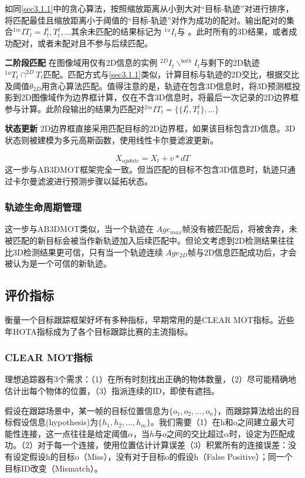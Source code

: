 如同\ref{sec3.1.1}中的贪心算法，按照缩放距离从小到大对“目标-轨迹”对进行排序，将匹配最佳且缩放距离小于阈值的“目标-轨迹”对作为成功的配对。输出配对的集合$^{1m}IT_t={{I_t^i,T_t^j},...}$其余未匹配的结果标记为 $^{1u}I_t$与 。此时所有的3D结果，或者成功配对，或者未配对且不参与后续匹配。

\textbf{二阶段匹配} 在图像域用仅有2D信息的实例 $^{2D}I_t\backslash^{both}I_t$与剩下的2D轨迹 $^{1u}T_t\cap^{2D}T_t$匹配。匹配方式与\ref{sec3.1.1}类似，计算目标与轨迹的2D交比，根据交比及阈值$\theta_{2D}$用贪心算法匹配。值得注意的是，轨迹在包含3D信息时，将3D预测框投影到2D图像域作为边界框计算，仅在不含3D信息时，将最后一次记录的2D边界框参与计算。此阶段输出的结果为匹配对$^{2m}IT_t=\{\{I_t^i,T_t^j\},...\}$

\textbf{状态更新} 2D边界框直接采用匹配目标的2D边界框，如果该目标包含2D信息。3D状态则被建模为多元高斯函数，使用线性卡尔曼滤波更新。

\begin{equation}
    X_{update}=X_t+v*dT
\end{equation}
这一步与AB3DMOT框架\cite{weng20203d}完全一致。但当匹配的目标不包含3D信息时，轨迹只通过卡尔曼滤波进行预测步骤以延拓状态。

\subsubsection{轨迹生命周期管理}

这一步与AB3DMOT类似，当一个轨迹在 $Age_{max}$帧没有被匹配后，将被舍弃，未被匹配的新目标会被当作新轨迹加入后续匹配中。但论文考虑到2D检测结果往往比3D检测结果更可信，只有当一个轨迹连续 $Age_{2D}$帧与2D信息匹配成功后，才会被认为是一个可信的新轨迹。

\subsection{评价指标}

衡量一个目标跟踪框架好坏有多种指标，早期常用的是CLEAR MOT\cite{bernardin2008evaluating}指标。近些年HOTA\cite{luiten2021hota}指标成为了各个目标跟踪比赛的主流指标。

\subsubsection{CLEAR MOT指标}

理想追踪器有3个需求：（1）在所有时刻找出正确的物体数量，（2）尽可能精确地估计出每个物体的位置，（3）指派连续的ID，即使有遮挡。

假设在跟踪场景中，某一帧的目标位置信息为$\{o_1,o_2,...,o_n\}$，而跟踪算法给出的目标假设信息(hypothesis)为$\{h_1,h_2,...,h_m\}$。我们需要（1）在h和o之间建立最大可能性连接，这一点往往是给定阈值$\alpha$，当$h$与$o$之间的交比超过$\alpha$时，设定为匹配成功。（2）对于每一个连接，使用位置估计计算误差（3）积累所有的连接误差：没有设定假设h的目标o（Miss），没有对于目标o的假设h（False Positive）；同一个目标ID改变（Mismatch）。

